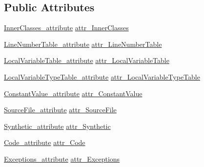 \subsection*{Public Attributes}
\begin{DoxyCompactItemize}
\item 
\hyperlink{attributes_8hpp_a11c3b261bde2a1da5fc73081cf62b4db}{Inner\+Classes\+\_\+attribute} \hyperlink{unionattribute__type__u_ade2324dcae8d2af69ed74c6ee6480a69}{attr\+\_\+\+Inner\+Classes}
\item 
\hyperlink{attributes_8hpp_af2b24f13bd3e5a26936bd16e72a76fff}{Line\+Number\+Table\+\_\+attribute} \hyperlink{unionattribute__type__u_ab8c71326a60a1e11695399dd2d123407}{attr\+\_\+\+Line\+Number\+Table}
\item 
\hyperlink{attributes_8hpp_a2985a5f278e47c68777158d1feac4d4f}{Local\+Variable\+Table\+\_\+attribute} \hyperlink{unionattribute__type__u_ad493b7616916c1499908c8a5faee1eb6}{attr\+\_\+\+Local\+Variable\+Table}
\item 
\hyperlink{attributes_8hpp_a5a25e5296f4e3d6a99598ff645e598f2}{Local\+Variable\+Type\+Table\+\_\+attribute} \hyperlink{unionattribute__type__u_ab4b51f1bb761ece948234b28200a9b7f}{attr\+\_\+\+Local\+Variable\+Type\+Table}
\item 
\hyperlink{attributes_8hpp_a4df3241aeeb4382aa355a8c4e4e6076e}{Constant\+Value\+\_\+attribute} \hyperlink{unionattribute__type__u_aaf4ebb5b100f6eab33f2da8a73f7415d}{attr\+\_\+\+Constant\+Value}
\item 
\hyperlink{attributes_8hpp_a493a40fa668908ed61dbb1f823d213ca}{Source\+File\+\_\+attribute} \hyperlink{unionattribute__type__u_aa43db97645b252b9af59f64077bafcca}{attr\+\_\+\+Source\+File}
\item 
\hyperlink{attributes_8hpp_a7dfc4097d3a6cf1ac27bf4ac345e7c99}{Synthetic\+\_\+attribute} \hyperlink{unionattribute__type__u_a148433b2820836cd82e91bf47761812a}{attr\+\_\+\+Synthetic}
\item 
\hyperlink{attributes_8hpp_ad1d2692bc09d9023430faad186e7647e}{Code\+\_\+attribute} \hyperlink{unionattribute__type__u_ad81e10d3ce60b779a53e25f9cbaeb550}{attr\+\_\+\+Code}
\item 
\hyperlink{attributes_8hpp_a472ae3f91d9dfb17a0125bd633c0a3ce}{Exceptions\+\_\+attribute} \hyperlink{unionattribute__type__u_a55eaf900114a14bb34695e1c0e3fe97c}{attr\+\_\+\+Exceptions}
\end{DoxyCompactItemize}


